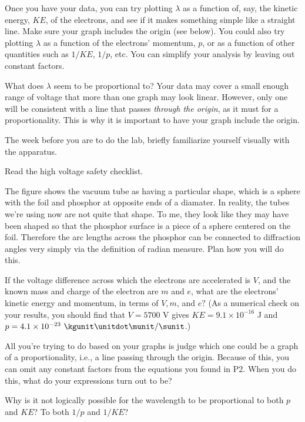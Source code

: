 \analysis

Once you have your data, you can try plotting $\lambda $ as
a function of, say, the kinetic energy, $KE$, of the
electrons, and see if it makes something simple like a
straight line. Make sure your graph includes the origin (see
below). You could also try plotting $\lambda $ as a function
of the electrons' momentum, $p$, or as a function of other
quantities such as $1/KE$, $1/p$, etc. You can simplify your
analysis by leaving out constant factors.

What does $\lambda $ seem to be proportional to? Your data
may cover a small enough range of voltage that more than one
graph may look linear. However, only one will be consistent
with a line that passes \emph{through the origin}, as
it must for a proportionality. This is why it
is important to have your graph include the origin.

\prelab

The week before you are to do the lab, briefly familiarize
yourself visually with the apparatus.

Read the high voltage safety checklist.

\prelabquestion  
The figure  shows the vacuum tube as having
a particular shape, which is a sphere with the foil and phosphor
at opposite ends of a diamater. In reality, the tubes we're using now are not quite that
shape. To me, they look like they may have been shaped so that the phosphor
surface is a piece of a sphere centered on the foil. Therefore the arc lengths across
the phosphor can be connected to diffraction angles very simply via the
definition of radian measure. Plan how you will do this.

\prelabquestion  If the voltage difference across which the electrons are
accelerated is $V$, and the known mass and charge of the
electron are $m$ and $e$, what are the electrons' kinetic
energy and momentum, in terms of $V,m$, and $e?$ (As a
numerical check on your results, you should find that
$V=5700$ V gives $KE=9.1\times10^{-16}$ J and
$p=4.1\times10^{-23}\ \kgunit\unitdot\munit/\sunit$.)

\prelabquestion All you're trying to do based on your graphs is judge which
one could be a graph of a proportionality, i.e., a line passing through the
origin. Because of this, you can omit any constant factors from the equations
you found in P2. When you do this, what do your expressions turn out to be?

\prelabquestion  Why is it not logically possible for the wavelength to
be proportional to both $p$ and $KE$? To both
$1/p$ and $1/KE$?

